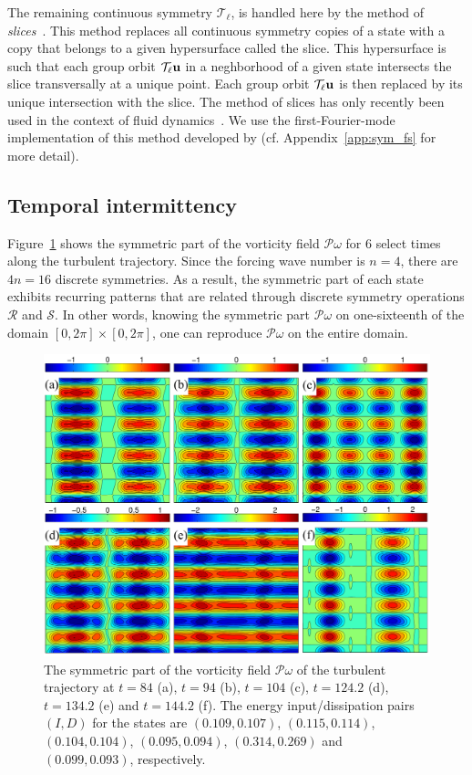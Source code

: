 \documentclass{article}
\begin{document}
The remaining continuous symmetry $\mathcal T_\ell$, is handled here by the method of
\emph{slices}~\citep{cartan35,field80,rowley03}.
This method replaces all continuous symmetry copies of a
state with a
copy that belongs to a given hypersurface called the slice. This hypersurface is such that each
group orbit $\mathcal T_\ell\mathbf u$
in a neghborhood of a given state
intersects the slice transversally at a unique point.
Each group orbit $\mathcal T_\ell\mathbf u$ is then replaced by its unique intersection with the slice.
The method of slices has only recently been used in the context of fluid
dynamics~\citep{ACHKW11,WSC15}.
We use the first-Fourier-mode implementation of this
method developed by (cf. Appendix~\ref{app:sym_fs} for more detail).

\subsection{Temporal intermittency}
Figure~\ref{fig:Pw_erg} shows the symmetric part of the vorticity field $\mathcal P\omega$
for 6 select times along the turbulent trajectory. Since the forcing wave number is
$n=4$, there are $4n=16$ discrete symmetries. As a result, the symmetric part of each state
exhibits recurring patterns that are related through discrete symmetry operations $\mathcal R$
and $\mathcal S$. In other words, knowing the symmetric part $\mathcal P\omega$ on one-sixteenth of
the domain $[0,2\pi]\times[0,2\pi]$, one can reproduce $\mathcal P\omega$ on the entire domain.
%
\begin{figure}[t]
\centering
\includegraphics[width=\textwidth]{Pw_erg}
\caption{The symmetric part of the vorticity field $\mathcal P\omega$
of the turbulent trajectory at
$t=84$ (a),
$t=94$ (b),
$t=104$ (c),
$t=124.2$ (d),
$t=134.2$ (e) and
$t=144.2$ (f).
The energy input/dissipation pairs $(I,D)$ for the states are
$(0.109,0.107)$,
$(0.115,0.114)$,
$(0.104,0.104)$,
$(0.095,0.094)$,
$(0.314,0.269)$ and
$(0.099,0.093)$, respectively.}
\label{fig:Pw_erg}
\end{figure}
\end{document}
